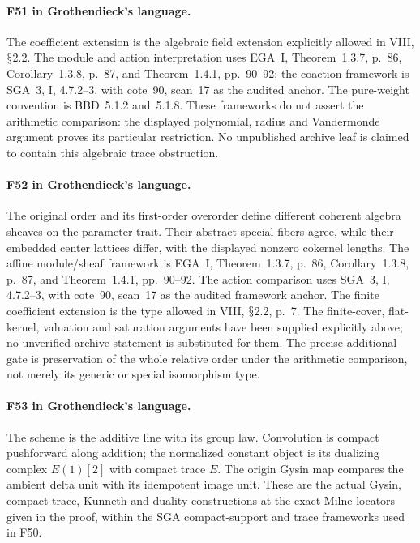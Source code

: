 \documentclass[11pt,a4paper]{article}
\renewcommand{\S}{\ensuremath{\mathsection}}
\newcommand{\fid}[1]{\textsf{#1}}\newcommand{\gate}[1]{\textsf{#1}}
\theoremstyle{named}\newtheorem{finding}{Finding}[section]
\theoremstyle{definition}\newtheorem{definition}[finding]{Definition}
\theoremstyle{remark}\newtheorem{remark}[finding]{Remark}
\begin{document}
\paragraph{\fid{F51} in Grothendieck's language.}
The coefficient extension is the algebraic field
extension explicitly allowed in VIII, \S2.2.
The module and action interpretation uses EGA~I,
Theorem~1.3.7, p.~86, Corollary~1.3.8, p.~87, and
Theorem~1.4.1, pp.~90--92; the coaction framework is
SGA~3, I, 4.7.2--3, with cote~90, scan~17 as the
audited anchor.
The pure-weight convention is BBD~5.1.2 and~5.1.8.
These frameworks do not assert the arithmetic
comparison: the displayed polynomial, radius and
Vandermonde argument proves its particular restriction.
No unpublished archive leaf is claimed to contain
this algebraic trace obstruction.

\paragraph{\fid{F52} in Grothendieck's language.}
The original order and its first-order overorder
define different coherent algebra sheaves on the
parameter trait. Their abstract special fibers agree,
while their embedded center lattices differ, with
the displayed nonzero cokernel lengths.
The affine module/sheaf framework is EGA~I,
Theorem~1.3.7, p.~86, Corollary~1.3.8, p.~87,
and Theorem~1.4.1, pp.~90--92.
The action comparison uses SGA~3, I, 4.7.2--3,
with cote~90, scan~17 as the audited framework anchor.
The finite coefficient extension is the type
allowed in VIII, \S2.2, p.~7.
The finite-cover, flat-kernel, valuation and
saturation arguments have been supplied explicitly
above; no unverified archive statement is substituted
for them.
The precise additional gate is preservation of the
whole relative order under the arithmetic comparison,
not merely its generic or special isomorphism type.

\paragraph{\fid{F53} in Grothendieck's language.}
The scheme is the additive line with its group law.
Convolution is compact pushforward along addition;
the normalized constant object is its dualizing
complex $E(1)[2]$ with compact trace $E$.
The origin Gysin map compares the ambient delta unit
with its idempotent image unit.
These are the actual Gysin, compact-trace, Kunneth
and duality constructions at the exact Milne locators
given in the proof, within the SGA compact-support
and trace frameworks used in \fid{F50}.
\end{document}
